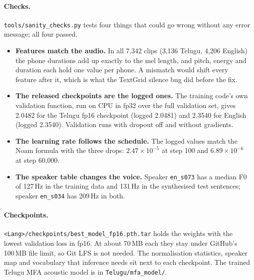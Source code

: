 \documentclass[11pt,a4paper]{article}
\newcommand{\code}[1]{\texttt{#1}}
\begin{document}
\paragraph{Checks.} \code{tools/sanity\_checks.py} tests four things that could go wrong without any error
message; all four passed.
\begin{itemize}
\item \textbf{Features match the audio.} In all 7,342 clips (3,136 Telugu, 4,206 English) the phone durations
add up exactly to the mel length, and pitch, energy and duration each hold one value per phone. A mismatch would
shift every feature after it, which is what the TextGrid silence bug did before the fix.
\item \textbf{The released checkpoints are the logged ones.} The training code's own validation function,
run on CPU in fp32 over the full validation set, gives 2.0482 for the Telugu fp16 checkpoint (logged 2.0481) and
2.3540 for English (logged 2.3540). Validation runs with dropout off and without gradients.
\item \textbf{The learning rate follows the schedule.} The logged values match the Noam formula with the three
drops: $2.47\times10^{-5}$ at step 100 and $6.89\times10^{-6}$ at step 60,000.
\item \textbf{The speaker table changes the voice.} Speaker \code{en\_s073} has a median F0 of 127\,Hz in the
training data and 131\,Hz in the synthesised test sentences; speaker \code{en\_s034} has 209\,Hz in both.
\end{itemize}

\paragraph{Checkpoints.} \code{<Lang>/checkpoints/best\_model\_fp16.pth.tar} holds the weights with the lowest
validation loss in fp16. At about 70\,MB each they stay under GitHub's 100\,MB file limit, so Git LFS is not needed.
The normalisation statistics, speaker map and vocabulary that inference needs sit next to each checkpoint. The
trained Telugu MFA acoustic model is in \code{Telugu/mfa\_model/}.
\end{document}
